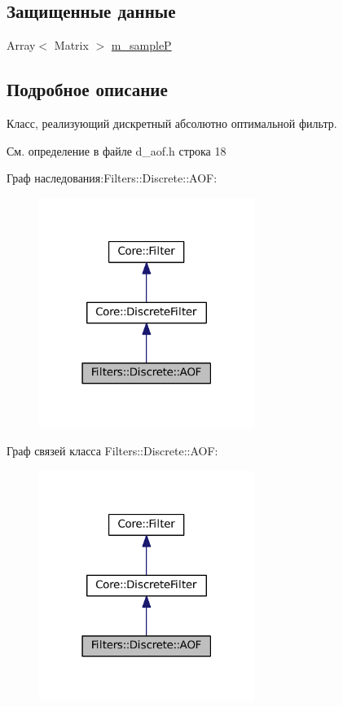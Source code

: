 \subsection*{Защищенные данные}
\begin{DoxyCompactItemize}
\item 
Array$<$ Matrix $>$ \hyperlink{class_filters_1_1_discrete_1_1_a_o_f_aef55ce0cf7129bb7090f8e470bcfbc1f}{m\+\_\+sampleP}
\end{DoxyCompactItemize}


\subsection{Подробное описание}
Класс, реализующий дискретный абсолютно оптимальной фильтр. 

См. определение в файле d\+\_\+aof.\+h строка 18



Граф наследования\+:Filters\+:\+:Discrete\+:\+:A\+OF\+:\nopagebreak
\begin{figure}[H]
\begin{center}
\leavevmode
\includegraphics[width=198pt]{class_filters_1_1_discrete_1_1_a_o_f__inherit__graph}
\end{center}
\end{figure}


Граф связей класса Filters\+:\+:Discrete\+:\+:A\+OF\+:\nopagebreak
\begin{figure}[H]
\begin{center}
\leavevmode
\includegraphics[width=198pt]{class_filters_1_1_discrete_1_1_a_o_f__coll__graph}
\end{center}
\end{figure}


